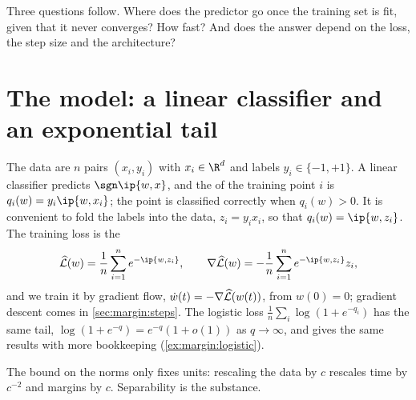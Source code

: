 \begin{refsection}
Three questions follow. Where does the predictor go once the training set is fit, given that it never converges? How fast? And does the answer depend on the loss, the step size and the architecture?

\section{The model: a linear classifier and an exponential tail}\label{sec:margin:model}

The data are $n$ pairs $(x_i,y_i)$ with $x_i\in\R^d$ and labels $y_i\in\{-1,+1\}$. A linear classifier predicts $\sgn\ip{w,x}$, and the  of the training point $i$ is $q_i(w)=y_i\ip{w,x_i}$; the point is classified correctly when $q_i(w)>0$. It is convenient to fold the labels into the data, $z_i=y_ix_i$, so that $q_i(w)=\ip{w,z_i}$. The training loss is the 
\begin{equation}\label{eq:margin:loss}
  \Lhat(w)=\frac1n\sum_{i=1}^ne^{-\ip{w,z_i}},\qquad \nabla\Lhat(w)=-\frac1n\sum_{i=1}^ne^{-\ip{w,z_i}}z_i ,
\end{equation}
and we train it by gradient flow, $\dot w(t)=-\nabla\widehat{\mathcal{L}}(w(t))$, from $w(0)=0$; gradient descent comes in \cref{sec:margin:steps}. The logistic loss $\frac1n\sum_i\log(1+e^{-q_i})$ has the same tail, $\log(1+e^{-q})=e^{-q}(1+o(1))$ as $q\to\infty$, and gives the same results with more bookkeeping (\cref{ex:margin:logistic}).


The bound on the norms only fixes units: rescaling the data by $c$ rescales time by $c^{-2}$ and margins by $c$. Separability is the substance.



\end{refsection}
